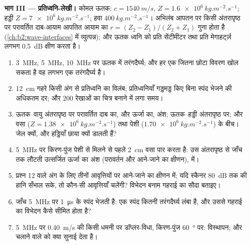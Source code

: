 \begin{problem}
\medskip
\noindent\textbf{भाग III --- प्रतिध्वनि-लेखी।}
कोमल ऊतक: $c = \qty{1540}{m/s}$, $Z = \qty{1.6e6}{kg.m^{-2}.s^{-1}}$; हड्डी
$Z = \qty{7e6}{kg.m^{-2}.s^{-1}}$; हवा $\qty{400}{kg.m^{-2}.s^{-1}}$। अभिलंब
आपतन पर किसी अंतरापृष्ठ पर परावर्तित दाब-आयाम आपतित आयाम का $r = (Z_2 -
Z_1)/(Z_2 + Z_1)$ गुना होता है (\cref{ch:b2:wave-interfaces} में
व्युत्पन्न); और ऊतक ध्वनि को प्रति सेंटीमीटर तथा प्रति मेगाहर्ट्ज़ लगभग
\qty{0.5}{dB} क्षीण करता है।
\begin{enumerate}[resume]
  \item \qty{3}{MHz}, \qty{5}{MHz}, \qty{10}{MHz} पर ऊतक में तरंगदैर्घ्य; और हर एक
        जितना छोटा विवरण खोल सकता है वह लगभग एक तरंगदैर्घ्य है।
  \item \qty{12}{cm} गहरे किसी अंग से प्रतिध्वनि का विलंब; प्रतिध्वनियाँ
        गड्डमड्ड किए बिना स्पंद भेजने की अधिकतम दर; और
        $200$ रेखाओं का चित्र बनाने में लगा समय।
  \item ऊतक--वायु अंतरापृष्ठ पर परावर्तित दाब का, और ऊर्जा का, अंश;
        ऊतक--हड्डी अंतरापृष्ठ पर; और वसा
        ($Z = \qty{1.38e6}{kg.m^{-2}.s^{-1}}$) तथा पेशी
        ($\qty{1.70e6}{kg.m^{-2}.s^{-1}}$) के बीच। जेल क्यों, और हड्डियाँ
        छाया क्यों डालती हैं?
  \item \qty{5}{MHz} पर किरण-पुंज पेशी से मिलने से पहले \qty{2}{cm} वसा पार
        करता है: उस अंतरापृष्ठ से जाँच तक लौटती उत्सर्जित ऊर्जा का अंश
        (परावर्तन और आने-जाने का
        क्षीणन),  में।
  \item प्रश्न 12 वाले अंग के लिए तीनों आवृत्तियों पर आने-जाने का
        क्षीणन  में; यदि स्कैनर \qty{80}{dB} तक की हानि
        सँभाल सके, तो कौन-सी आवृत्तियाँ चलेंगी? विभेदन बनाम गहराई का
        सौदा बताइए।
  \item जाँच \qty{5}{MHz} पर \qty{1}{\micro s} के स्पंद भेजती है: एक स्पंद कितनी
        तरंगदैर्घ्य लंबा है, और उससे गहराई का विभेदन कैसे
        सीमित होता है?
  \item \qty{5}{MHz} पर \qty{0.40}{m/s} की किसी धमनी पर डॉप्लर-विधा, किरण-पुंज
        \qty{60}{\degree} पर: विस्थापन; और चलाने वाले को क्या सुनाई देता है।
\end{enumerate}


\end{problem}
